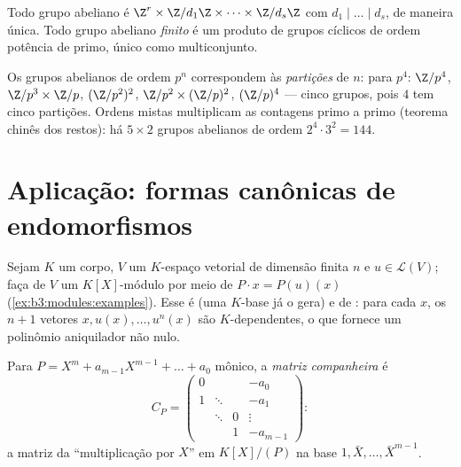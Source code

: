 \begin{corollary}
\label{cor:b3:modules:abelian}
Todo grupo abeliano  é $\Z^r \times
\Z/d_1\Z\times\dots\times\Z/d_s\Z$ com $d_1 \mid \dots \mid
d_s$, de maneira
única. Todo grupo abeliano \emph{finito} é um produto de grupos
cíclicos de ordem potência de primo, único como
multiconjunto.
\end{corollary}

\begin{example}\label{ex:b3:modules:abelian}
Os grupos abelianos de ordem $p^n$ correspondem às
\emph{partições} de $n$: para $p^4$: $\Z/p^4$, $\Z/p^3\times\Z/p$, $(\Z/p^2)^2$,
$\Z/p^2 \times (\Z/p)^2$, $(\Z/p)^4$ --- cinco grupos, pois $4$ tem cinco partições. Ordens
mistas multiplicam as contagens primo a primo (teorema chinês dos
restos): há $5 \times 2$ grupos abelianos de ordem $2^4 \cdot 3^2 = 144$.
\end{example}

\section{Aplicação: formas canônicas de endomorfismos}

Sejam $K$ um corpo, $V$ um $K$-espaço vetorial de dimensão
finita $n$ e $u \in \mathcal L(V)$; faça de $V$ um $K[X]$-módulo por meio de
$P
\cdot x = P(u)(x)$ (\cref{ex:b3:modules:examples}). Esse  é  (uma
$K$-base já o gera) e de : para cada $x$, os $n+1$
vetores $x, u(x), \dots, u^n(x)$ são $K$-dependentes, o que fornece um polinômio
aniquilador não nulo.

\begin{definition}\label{def:b3:modules:companion}
Para $P = X^m + a_{m-1}X^{m-1} + \dots + a_0$ mônico, a \emph{matriz companheira} é
\[
C_P = \begin{pmatrix}
0 & & & -a_0\\
1 & \ddots & & -a_1\\
& \ddots & 0 & \vdots\\
& & 1 & -a_{m-1}
\end{pmatrix} :
\]
a matriz da ``multiplicação por $X$'' em $K[X]/(P)$ na base $1, \bar X, \dots, \bar X^{m-1}$.
\end{definition}

